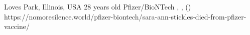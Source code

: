           {Loves Park, Illinois, USA}
          {28 years old}
          {Pfizer/BioNTech }
          {}
          {
            ,
            ,
             ()
          }
          {https://nomoresilence.world/pfizer-biontech/sara-ann-stickles-died-from-pfizer-vaccine/}

